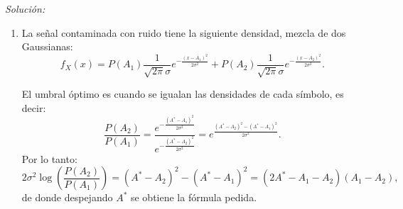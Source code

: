 \documentclass[a4paper,11pt]{article}
\newenvironment{solucion}[1][]{
\noindent \large \textsl{Solución:} \ifthenelse{\equal{#1}{}}{}{\emph{(#1)}}

\smallskip
}{
\bigskip
}
\begin{document}
\begin{solucion}
\begin{enumerate}
\item La señal contaminada con ruido tiene la siguiente densidad, mezcla de dos Gaussianas:
        \begin{equation*}
                f_X(x) = P(A_1) \frac{1}{\sqrt{2\pi}\sigma}e^{-\frac{(x-A_1)^2}{2\sigma^2}} + P(A_2)\frac{1}{\sqrt{2\pi}\sigma}e^{-\frac{(x-A_2)^2}{2\sigma^2}}.
        \end{equation*}
        \begin{center}
        \end{center}
        El umbral óptimo es cuando se igualan las densidades de cada símbolo, es decir:
        \begin{equation*}
                \frac{P(A_2)}{P(A_1)} = \frac{e^{-\frac{(A^*-A_1)^2}{2\sigma^2}}}{e^{-\frac{(A^*-A_2)^2}{2\sigma^2}}} = e^{\frac{(A^*-A_2)^2-(A^*-A_1)^2}{2\sigma^2}}.
        \end{equation*}
        Por lo tanto:
        \begin{equation*}
                2\sigma^2 \log\left(\frac{P(A_2)}{P(A_1)}\right) = (A^*-A_2)^2-(A^*-A_1)^2 = (2A^*-A_1-A_2)(A_1-A_2),
        \end{equation*}
        de donde despejando $A^*$ se obtiene la fórmula pedida.


\end{enumerate}
\end{solucion}
\end{document}
